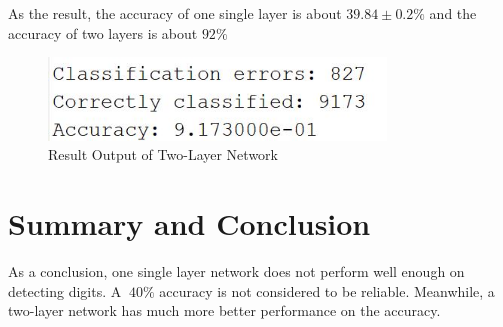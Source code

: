 \documentclass[preprint,12pt]{elsarticle}
\begin{document}
        As the result, the accuracy of one single layer is about $39.84 \pm 0.2\%$ and the accuracy of two layers 
        is about $92\%$
        \begin{figure}[h]
            \center
            \includegraphics[width = 0.8\textwidth]{result.jpg}
            \caption{Result Output of Two-Layer Network}
            \label{fig:5}
        \end{figure}


        \section{Summary and Conclusion}
        As a conclusion, one single layer network does not perform well enough on detecting digits. A $~40\%$ accuracy
        is not considered to be reliable. Meanwhile, a two-layer network has much more better performance on the accuracy.

    
        \mbox{~}
        \clearpage
        \begin{appendices}
            
        \end{appendices}
    
    
\end{document}
